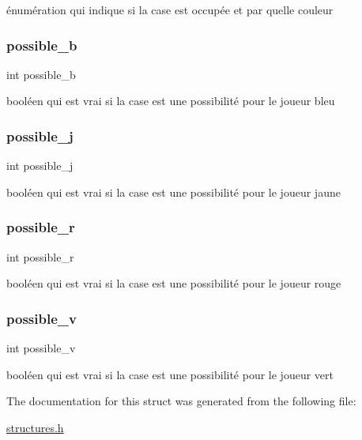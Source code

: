 énumération qui indique si la case est occupée et par quelle couleur \mbox{\label{structt__case_ab65cd63e09f9a6828163976ece9aeaba}} 
\subsubsection{\texorpdfstring{possible\+\_\+b}{possible\_b}}
{\footnotesize\ttfamily int possible\+\_\+b}

booléen qui est vrai si la case est une possibilité pour le joueur bleu \mbox{\label{structt__case_a644f4e75358f7354e07c861a86467600}} 
\subsubsection{\texorpdfstring{possible\+\_\+j}{possible\_j}}
{\footnotesize\ttfamily int possible\+\_\+j}

booléen qui est vrai si la case est une possibilité pour le joueur jaune \mbox{\label{structt__case_af044dfbf634bb4deb44becbf8ab549d8}} 
\subsubsection{\texorpdfstring{possible\+\_\+r}{possible\_r}}
{\footnotesize\ttfamily int possible\+\_\+r}

booléen qui est vrai si la case est une possibilité pour le joueur rouge \mbox{\label{structt__case_aeccebd9f99eb3bec0a7b2fc0633253fe}} 
\subsubsection{\texorpdfstring{possible\+\_\+v}{possible\_v}}
{\footnotesize\ttfamily int possible\+\_\+v}

booléen qui est vrai si la case est une possibilité pour le joueur vert 

The documentation for this struct was generated from the following file\+:\begin{DoxyCompactItemize}
\item 
\mbox{\hyperlink{structures_8h}{structures.\+h}}\end{DoxyCompactItemize}
